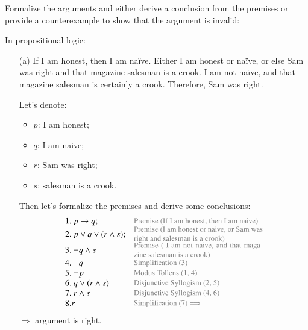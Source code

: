 \documentclass[12pt]{report}
\begin{document}
\boldmath
{}
    \begin{problem}{}
        Formalize the arguments and either derive a conclusion from the premises or provide a counterexample to show that the argument is invalid: 
        
        \par
        In propositional logic: 
        
        \begin{itemize}
            \item[(a)] If I am honest, then I am naïve. Either I am honest or naïve, or else Sam was right and that magazine salesman is a crook. I am not naïve, and that magazine salesman is certainly a crook. Therefore, Sam was right. 
        \par
        Let's denote:
        \begin{itemize}
            \item $p$: I am honest;
            \item $q$: I am naive;
            \item $r$: Sam was right;
            \item $s$: salesman is a crook.
        \end{itemize}
        Then let's formalize the premises and derive some conclusions:
        \[
            \begin{array}{lr}
                1.\  p \rightarrow q; & \parbox{15.3em}{\small\color{gray} Premise (If I am honest, then I am naive)}\\
                2.\  p \vee q \vee (r \wedge s); &\parbox{15.3em}{\small\color{gray}\small Premise (I am honest or naive, or Sam was right and salesman is a crook)}\\
                3.\  \neg q \wedge  s &\parbox{15.3em}{\small\color{gray} Premise ( I am not naive, and that magazine salesman is a crook)}\\
                4.\  \neg q &\parbox{15.3em}{\small\color{gray} Simplification (3)}\\
                5.\  \neg p & \parbox{15.3em}{\small\color{gray} Modus Tollens (1, 4)}\\
                6.\  q \vee (r \wedge s) & \parbox{15.3em}{\small\color{gray} Disjunctive Syllogism (2, 5)}\\
                7.\  r \wedge s & \parbox{15.3em}{\small\color{gray} Disjunctive Syllogism (4, 6)}\\
                8. r & \parbox{15.3em}{\small\color{gray} Simplification (7) $\Longrightarrow$} 
            \end{array}
        \]
        $\Rightarrow$ argument is right.


\end{itemize}
\end{problem}
\end{document}
